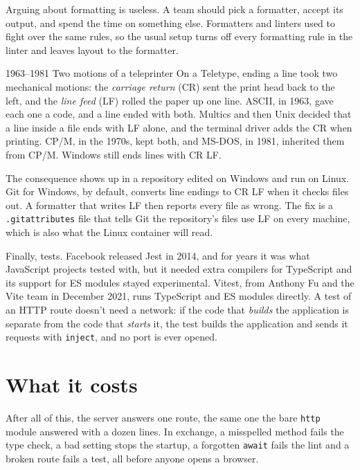 Arguing about formatting is useless. A team should pick a formatter, accept
its output, and spend the time on something else. Formatters and linters used
to fight over the same rules, so the usual setup turns off every formatting
rule in the linter and leaves layout to the formatter.

\begin{history}{1963--1981 \textperiodcentered{} Two motions of a teleprinter}
On a Teletype, ending a line took two mechanical motions: the
\emph{carriage return} (CR) sent the print head back to the left, and the
\emph{line feed} (LF) rolled the paper up one line. ASCII, in 1963, gave each
one a code, and a line ended with both. Multics and then Unix decided that a
line inside a file ends with LF alone, and the terminal driver adds the CR when
printing. CP/M, in the 1970s, kept both, and MS-DOS, in 1981, inherited them
from CP/M. Windows still ends lines with CR LF.
\end{history}

The consequence shows up in a repository edited on Windows and run on Linux.
Git for Windows, by default, converts line endings to CR LF when it checks
files out. A formatter that writes LF then reports every file as wrong. The fix
is a \texttt{.gitattributes} file that tells Git the repository's files use LF
on every machine, which is also what the Linux container will read.

Finally, tests. Facebook released Jest in 2014, and for years it was what
JavaScript projects tested with, but it needed extra compilers for TypeScript
and its support for ES modules stayed experimental. Vitest, from Anthony Fu
and the Vite team in December 2021, runs TypeScript and ES modules directly. A
test of an HTTP route doesn't need a network: if the code that \emph{builds}
the application is separate from the code that \emph{starts} it, the test
builds the application and sends it requests with \texttt{inject}, and no port
is ever opened.

\section{What it costs}

After all of this, the server answers one route, the same one the bare
\texttt{http} module answered with a dozen lines. In exchange, a misspelled
method fails the type check, a bad setting stops the startup, a forgotten
\texttt{await} fails the lint and a broken route fails a test, all before
anyone opens a browser.

